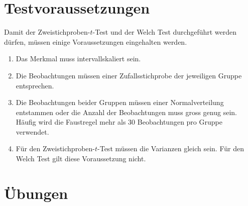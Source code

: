 \documentclass[
]{book}
\providecommand{\tightlist}{%
  \setlength{\itemsep}{0pt}\setlength{\parskip}{0pt}}
\theoremstyle{definition}
\theoremstyle{definition}
\theoremstyle{definition}
\theoremstyle{definition}
\theoremstyle{remark}
\begin{document}
\section{Testvoraussetzungen}\label{testvoraussetzungen-1}

Damit der Zweistichproben-\(t\)-Test und der Welch Test durchgeführt werden dürfen, müssen einige Voraussetzungen eingehalten werden.

\begin{enumerate}
\def\labelenumi{\arabic{enumi}.}
\tightlist
\item
  Das Merkmal muss intervallskaliert sein.
\item
  Die Beobachtungen müssen einer Zufallsstichprobe der jeweiligen Gruppe entsprechen.
\item
  Die Beobachtungen beider Gruppen müssen einer Normalverteilung entstammen oder die Anzahl der Beobachtungen muss gross genug sein. Häufig wird die Faustregel mehr als \(30\) Beobachtungen pro Gruppe verwendet.
\item
  Für den Zweistichproben-\(t\)-Test müssen die Varianzen gleich sein. Für den Welch Test gilt diese Voraussetzung nicht.
\end{enumerate}

\section{Übungen}\label{uxfcbungen-3}
\end{document}
